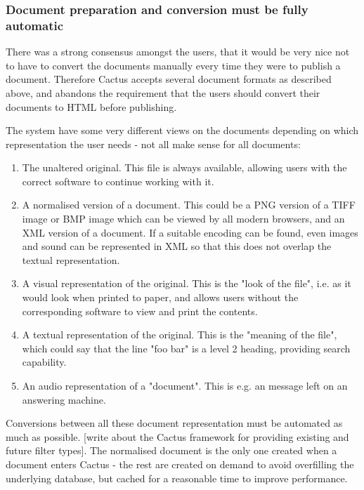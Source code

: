 \subsubsection{Document preparation and conversion must be fully automatic}

There was a strong consensus amongst the users, that it would be very
nice not to have to convert the documents manually every time they
were to publish a document.  Therefore Cactus accepts several document
formats as described above, and abandons the requirement that the
users should convert their documents to HTML before publishing.

The system have some very different views on the documents depending
on which representation the user needs - not all make sense for all
documents:

\begin{enumerate}
\item The unaltered original.  This file is always available, allowing
  users with the correct software to continue working with it.

\item A normalised version of a document.  This could be a PNG version
  of a TIFF image or BMP image which can be viewed by all modern
  browsers, and an XML version of a document.  If a suitable encoding
  can be found, even images and sound can be represented in XML so
  that this does not overlap the textual representation.

\item A visual representation of the original.  This is the "look of
  the file", i.e. as it would look when printed to paper, and allows
  users without the corresponding software to view and print the
  contents.

\item A textual representation of the original.  This is the "meaning
  of the file", which could say that the line "foo bar" is a level 2
  heading, providing search capability.

  
\item An audio representation of a "document".  This is e.g. an
  message left on an answering machine.
\end{enumerate}

Conversions between all these document representation must be
automated as much as possible.  [write about the Cactus framework for
providing existing and future filter types].  The normalised document
is the only one created when a document enters Cactus - the rest are
created on demand to avoid overfilling the underlying database, but
cached for a reasonable time to improve performance.

